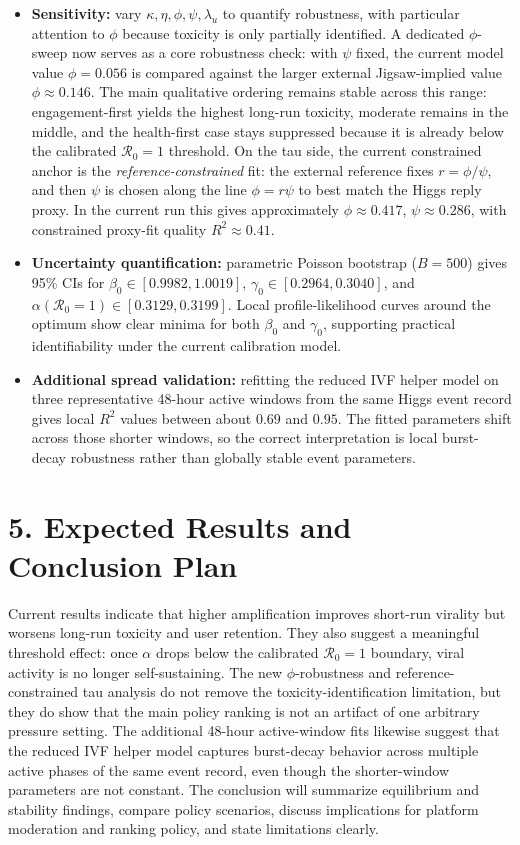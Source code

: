 \documentclass[11pt]{article}
\begin{document}
\begin{itemize}[leftmargin=1.3em]
\item \textbf{Sensitivity:} vary $\kappa,\eta,\phi,\psi,\lambda_u$ to quantify robustness, with particular attention to $\phi$ because toxicity is only partially identified. A dedicated $\phi$-sweep now serves as a core robustness check: with $\psi$ fixed, the current model value $\phi=0.056$ is compared against the larger external Jigsaw-implied value $\phi\approx 0.146$. The main qualitative ordering remains stable across this range: engagement-first yields the highest long-run toxicity, moderate remains in the middle, and the health-first case stays suppressed because it is already below the calibrated $\mathcal{R}_0=1$ threshold. On the tau side, the current constrained anchor is the \emph{reference-constrained} fit: the external reference fixes $r=\phi/\psi$, and then $\psi$ is chosen along the line $\phi=r\psi$ to best match the Higgs reply proxy. In the current run this gives approximately $\phi\approx 0.417$, $\psi\approx 0.286$, with constrained proxy-fit quality $R^2\approx 0.41$.
\item \textbf{Uncertainty quantification:} parametric Poisson bootstrap ($B=500$) gives 95\% CIs for $\beta_0\in[0.9982,1.0019]$, $\gamma_0\in[0.2964,0.3040]$, and $\alpha(\mathcal{R}_0\!=\!1)\in[0.3129,0.3199]$. Local profile-likelihood curves around the optimum show clear minima for both $\beta_0$ and $\gamma_0$, supporting practical identifiability under the current calibration model.
\item \textbf{Additional spread validation:} refitting the reduced IVF helper model on three representative 48-hour active windows from the same Higgs event record gives local $R^2$ values between about $0.69$ and $0.95$. The fitted parameters shift across those shorter windows, so the correct interpretation is local burst-decay robustness rather than globally stable event parameters.
\end{itemize}

\section*{5. Expected Results and Conclusion Plan}
Current results indicate that higher amplification improves short-run virality but worsens long-run toxicity and user retention. They also suggest a meaningful threshold effect: once $\alpha$ drops below the calibrated $\mathcal{R}_0=1$ boundary, viral activity is no longer self-sustaining. The new $\phi$-robustness and reference-constrained tau analysis do not remove the toxicity-identification limitation, but they do show that the main policy ranking is not an artifact of one arbitrary pressure setting. The additional 48-hour active-window fits likewise suggest that the reduced IVF helper model captures burst-decay behavior across multiple active phases of the same event record, even though the shorter-window parameters are not constant. The conclusion will summarize equilibrium and stability findings, compare policy scenarios, discuss implications for platform moderation and ranking policy, and state limitations clearly.
\end{document}

